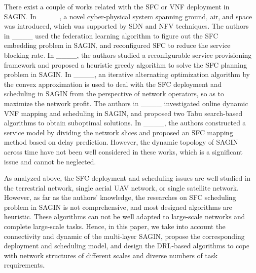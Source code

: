 There exist a couple of works related with the SFC or VNF deployment in SAGIN. In ____, a novel cyber-physical system spanning ground, air, and space was introduced, which was supported by SDN and NFV techniques. The authors in ____ used the federation learning algorithm to figure out the SFC embedding problem in SAGIN, and reconfigured SFC to reduce the service blocking rate. In ____, the authors studied a reconfigurable service provisioning framework and proposed a heuristic greedy algorithm to solve the SFC planning problem in SAGIN. In ____, an iterative alternating optimization algorithm by the convex approximation is used to deal with the SFC deployment and scheduling in SAGIN from the perspective of network operators, so as to maximize the network profit. The authors in ____ investigated online dynamic VNF mapping and scheduling in SAGIN, and proposed two Tabu search-based algorithms to obtain suboptimal solutions. In ____, the authors constructed a service model by dividing the network slices and proposed an SFC mapping method based on delay prediction. However, the dynamic topology of SAGIN across time have not been well considered in these works, which is a significant issue and cannot be neglected.

As analyzed above, the SFC deployment and scheduling issues are well studied in the terrestrial network, single aerial UAV network, or single satellite network. However, as far as the authors' knowledge, the researches on SFC scheduling problem in SAGIN is not comprehensive, and most designed algorithms are heuristic. These algorithms can not be well adapted to large-scale networks and complete large-scale tasks. Hence, in this paper, we take into account the connectivity and dynamic of the multi-layer SAGIN, propose the corresponding deployment and scheduling model, and design the DRL-based algorithms to cope with network structures of different scales and diverse numbers of task requirements.